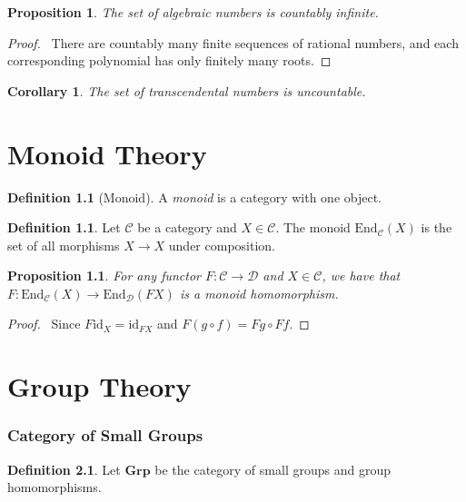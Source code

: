 \documentclass{book}
\let\qed\relax
\newtheorem{prop}[ax]{Proposition}
\newtheorem{cor}{Corollary}[ax]
\theoremstyle{definition}
\newtheorem{df}[ax]{Definition}
\newcommand{\id}[1]{\ensuremath{\mathrm{id}_{#1}}}
\begin{document}
\begin{prop}
The set of algebraic numbers is countably infinite.
\end{prop}

\begin{proof}
\pf\ There are countably many finite sequences of rational numbers, and each corresponding polynomial has only finitely many roots. \qed
\end{proof}

\begin{cor}
The set of transcendental numbers is uncountable.
\end{cor}

\chapter{Monoid Theory}

\begin{df}[Monoid]
A \emph{monoid} is a category with one object.
\end{df}

\begin{df}
Let $\mathcal{C}$ be a category and $X \in \mathcal{C}$. The monoid $\mathrm{End}_\mathcal{C}(X)$ is the set of all morphisms $X \rightarrow X$ under composition.
\end{df}

\begin{prop}
For any functor $F : \mathcal{C} \rightarrow \mathcal{D}$ and $X \in \mathcal{C}$, we have that $F : \mathrm{End}_\mathcal{C}(X) \rightarrow \mathrm{End}_\mathcal{D}(FX)$ is a monoid homomorphism.
\end{prop}

\begin{proof}
\pf\ Since $F \id{X} = \id{FX}$ and $F(g \circ f) = Fg \circ Ff$. \qed
\end{proof}

\chapter{Group Theory}

\subsection{Category of Small Groups}

\begin{df}
Let $\mathbf{Grp}$ be the category of small groups and group homomorphisms.
\end{df}
\end{document}
